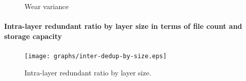 \begin{figure}
	\centering
	\caption{Wear variance}
	\label{fig:eval-stdev-erasure-cnt}
\end{figure}

\paragraph{Intra-layer redundant ratio by layer size in terms of file count and storage capacity}

\begin{figure}
	\centering
	\texttt{[image: graphs/inter-dedup-by-size.eps]}
	\caption{Intra-layer redundant ratio by layer size.
	}
	\label{fig_redundant_overhead}
\end{figure}

